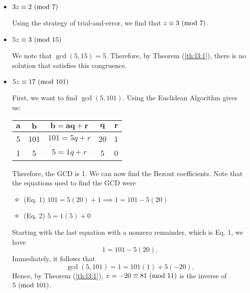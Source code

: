 \documentclass[letterpaper]{article}
\begin{document}
\begin{mdframed}
\begin{itemize}
        \item $3z \equiv 2 \ (\mathrm{mod}\ 7)$
        \begin{mdframed}
            Using the strategy of trial-and-error, we find that $z \equiv 3 \ (\mathrm{mod}\ 7)$. 
        \end{mdframed}
        
        \item $5z \equiv 3 \ (\mathrm{mod}\ 15)$
        \begin{mdframed}
            We note that $\gcd(5, 15) = 5$. Therefore, by Theorem (\ref{th:l3:1}), there is no solution that satisfies this congruence.
        \end{mdframed}

        \item $5z \equiv 17 \ (\mathrm{mod}\ 101)$
        \begin{mdframed}
            First, we want to find $\gcd(5, 101)$. Using the Euclidean Algorithm gives us:
            \begin{center}
                \begin{tabular}{|c|c|c|c|c|}
                    \hline 
                    $\mathbf{a}$ & $\mathbf{b}$ & $\mathbf{b = aq + r}$ & $\mathbf{q}$ & $\mathbf{r}$ \\ 
                    \hline 
                    5 & 101 & $101 = 5q + r$ & 20 & 1 \\ 
                    1 & 5 & $5 = 1q + r$ & 5 & 0 \\ 
                    \hline 
                \end{tabular}
            \end{center}
            Therefore, the GCD is 1. We can now find the Bezout coefficients. Note that the equations used to find the GCD were 
            \begin{itemize}
                \item (Eq. 1) $101 = 5(20) + 1 \implies 1 = 101 - 5(20)$
                \item (Eq. 2) $5 = 1(5) + 0$
            \end{itemize}
            
            Starting with the last equation with a nonzero remainder, which is Eq. 1, we have 
            \[1 = 101 - 5(20).\]
            Immediately, it follows that 
            \[\gcd(5, 101) = 1 = 101(1) + 5(-20).\]
            Hence, by Theorem (\ref{th:l3:1}), $x = -20 \equiv 81 \ (\mathrm{mod}\ 11)$ is the inverse of $5 \ (\mathrm{mod}\ 101)$.

            \bigskip 


\end{mdframed}
\end{itemize}
\end{mdframed}
\end{document}

